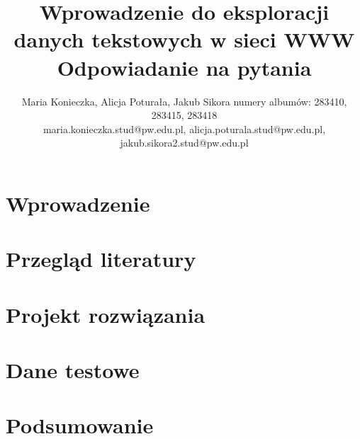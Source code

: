 \documentclass{article}
\title{Wprowadzenie do eksploracji danych tekstowych w sieci WWW\\ Odpowiadanie na pytania}
\author{
Maria Konieczka, Alicja Poturała, Jakub Sikora
\affiliations
numery albumów: 283410, 283415, 283418 \\
\emails
maria.konieczka.stud@pw.edu.pl, alicja.poturala.stud@pw.edu.pl, jakub.sikora2.stud@pw.edu.pl
}
\begin{document}
\maketitle

\section{Wprowadzenie}
\label{sec:wprowadzenie}


\section{Przegląd literatury}
\label{sec:przeglad}


\section{Projekt rozwiązania}
\label{sec:projekt-rozwiazania}


\section{Dane testowe}
\label{sec:dane-testowe}


\section{Podsumowanie}
\label{sec:podsumowanie}




\end{document}
